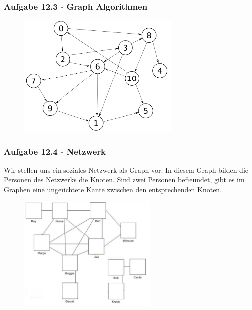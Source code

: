 \documentclass{beamer}
\begin{document}
\begin{frame}
	\frametitle{Aufgabe 12.3 - Graph Algorithmen}

	\begin{figure}
		\centering
		\includegraphics[width=0.7\textwidth]{images/graph12_3.png}
	\end{figure}
\end{frame}




\begin{frame}
	\frametitle{Aufgabe 12.4 - Netzwerk}
	\small
	Wir stellen uns ein soziales Netzwerk als Graph vor. In diesem Graph bilden die Personen des
	Netzwerks die Knoten. Sind zwei Personen befreundet, gibt es im Graphen eine ungerichtete
	Kante zwischen den entsprechenden Knoten.

	\begin{figure}
		\centering
		\includegraphics[width=0.6\textwidth]{images/graph12_4.png}
	\end{figure}
\end{frame}
\end{document}
